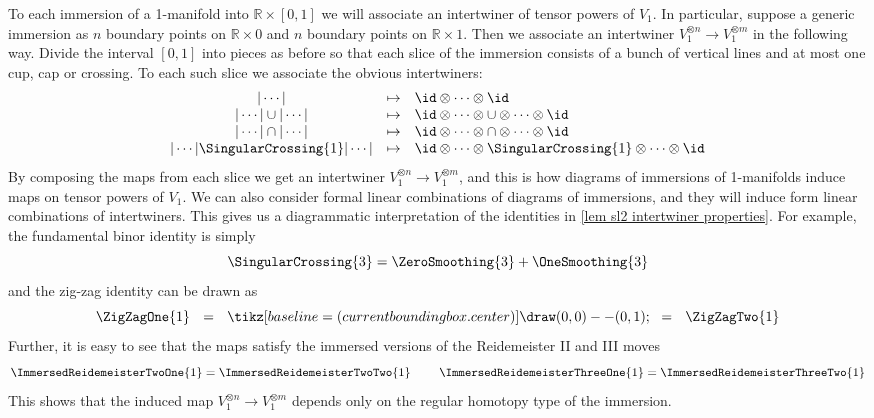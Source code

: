 To each immersion of a 1-manifold into $\mathbb R \times [0,1]$ we will associate an intertwiner of tensor powers of $V_1$. In particular, suppose a generic immersion as $n$ boundary points on $\mathbb R \times 0$ and $n$ boundary points on $\mathbb R \times 1$. Then we associate an intertwiner $V_1^{\otimes n} \rightarrow V_1^{\otimes m}$ in the following way. Divide the interval $[0,1]$ into pieces as before so that each slice of the immersion consists of a bunch of vertical lines and at most one cup, cap or crossing. To each such slice we associate the obvious intertwiners:
\[
\begin{array}{ccl}
	|\cdots| &\mapsto& \id \otimes \cdots \otimes \id \\
	|\cdots|\cup|\cdots| &\mapsto& \id \otimes \cdots \otimes \cup \otimes \cdots \otimes \id \\
	|\cdots|\cap|\cdots| &\mapsto& \id \otimes \cdots \otimes \cap \otimes \cdots \otimes \id \\
	|\cdots|\SingularCrossing{1}|\cdots| &\mapsto& \id \otimes \cdots \otimes \SingularCrossing{1} \otimes \cdots \otimes \id 
\end{array}
\]
By composing the maps from each slice we get an intertwiner $V_1^{\otimes n} \rightarrow V_1^{\otimes m}$, and this is how diagrams of immersions of 1-manifolds induce maps on tensor powers of $V_1$. We can also consider formal linear combinations of diagrams of immersions, and they will induce form linear combinations of intertwiners. This gives us a diagrammatic interpretation of the identities in \cref{lem sl2 intertwiner properties}. For example, the fundamental binor identity is simply
\[ \SingularCrossing{3} = \ZeroSmoothing{3} + \OneSmoothing{3} \]
and the zig-zag identity can be drawn as
\[ \ZigZagOne{1} \ \ = \ \ \tikz[baseline=(current bounding box.center)] \draw (0,0)--(0,1); \ \ = \ \ \ZigZagTwo{1} \]
Further, it is easy to see that the maps satisfy the immersed versions of the Reidemeister II and III moves
\[ \ImmersedReidemeisterTwoOne{1} = \ImmersedReidemeisterTwoTwo{1} \ \ \ \ \ \ \ \ImmersedReidemeisterThreeOne{1} = \ImmersedReidemeisterThreeTwo{1} \]
This shows that the induced map $V_1^{\otimes n} \rightarrow V_1^{\otimes m}$ depends only on the regular homotopy type of the immersion.














